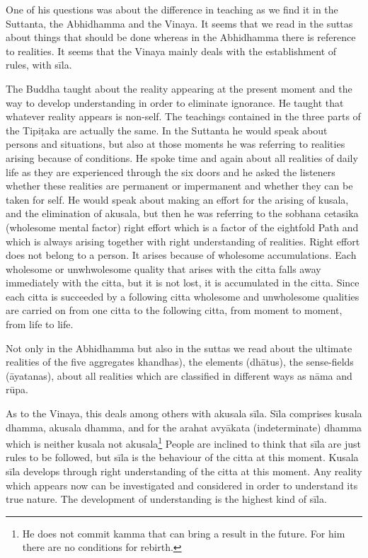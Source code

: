 One of his questions was about the difference in teaching as
we find it in the Suttanta, the
Abhidhamma and the Vinaya. It seems that we read in the
suttas about things that should be done whereas in the Abhidhamma there
is reference to realities. It seems that the Vinaya mainly deals with
the establishment of rules, with sīla.

The Buddha taught about the reality appearing at the present
moment and the way to develop understanding in order to eliminate
ignorance. He taught that whatever reality appears is non-self. The
teachings contained in the three parts of the Tipiṭaka are actually the
same. In the Suttanta he would speak about persons and situations, but
also at those moments he was referring to realities arising because of
conditions. He spoke time and again about all realities of daily life as
they are experienced through the six doors and he asked the listeners
whether these realities are permanent or impermanent and whether they
can be taken for self. He would speak about making an effort for the
arising of kusala, and the elimination of akusala, but then he was
referring to the sobhana cetasika (wholesome mental factor) right effort
which is a factor of the eightfold Path and which is always arising
together with right understanding of realities. Right effort does not
belong to a person. It arises because of wholesome accumulations. Each
wholesome or unwhwolesome quality that arises with the citta falls away
immediately with the citta, but it is not lost, it is accumulated in the
citta. Since each citta is succeeded by a following citta wholesome and
unwholesome qualities are carried on from one citta to the following
citta, from moment to moment, from life to life. 

Not only in the Abhidhamma but also in the suttas we read
about the ultimate realities of the five aggregates 
khandhas), the elements (dhātus),
the sense-fields (āyatanas), about all realities which are classified in
different ways as nāma and rūpa. 

As to the Vinaya, this deals among others with akusala sīla.
Sīla comprises kusala dhamma, akusala dhamma, and for the arahat
avyākata (indeterminate) dhamma which is neither kusala not
akusala\footnote{He does not commit
kamma that can bring a result in the future. For him there are no
conditions for rebirth.}
People are inclined to think that sīla are just rules to be followed,
but sīla is the behaviour of the citta at this moment. Kusala sīla
develops through right understanding of the citta at this moment. Any
reality which appears now can be investigated and considered in order to
understand its true nature. The development of understanding is the
highest kind of sīla.


